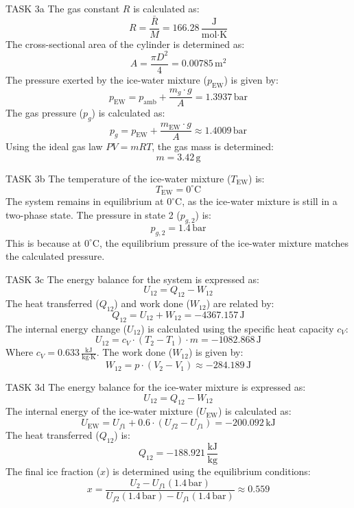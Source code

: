 TASK 3a  
The gas constant \( R \) is calculated as:  
\[
R = \frac{\bar{R}}{M} = 166.28 \, \frac{\text{J}}{\text{mol·K}}
\]  
The cross-sectional area of the cylinder is determined as:  
\[
A = \frac{\pi D^2}{4} = 0.00785 \, \text{m}^2
\]  
The pressure exerted by the ice-water mixture (\( p_{\text{EW}} \)) is given by:  
\[
p_{\text{EW}} = p_{\text{amb}} + \frac{m_g \cdot g}{A} = 1.3937 \, \text{bar}
\]  
The gas pressure (\( p_g \)) is calculated as:  
\[
p_g = p_{\text{EW}} + \frac{m_{\text{EW}} \cdot g}{A} \approx 1.4009 \, \text{bar}
\]  
Using the ideal gas law \( PV = mRT \), the gas mass is determined:  
\[
m = 3.42 \, \text{g}
\]  

TASK 3b  
The temperature of the ice-water mixture (\( T_{\text{EW}} \)) is:  
\[
T_{\text{EW}} = 0^\circ\text{C}
\]  
The system remains in equilibrium at \( 0^\circ\text{C} \), as the ice-water mixture is still in a two-phase state. The pressure in state 2 (\( p_{g,2} \)) is:  
\[
p_{g,2} = 1.4 \, \text{bar}
\]  
This is because at \( 0^\circ\text{C} \), the equilibrium pressure of the ice-water mixture matches the calculated pressure.  

TASK 3c  
The energy balance for the system is expressed as:  
\[
U_{12} = Q_{12} - W_{12}
\]  
The heat transferred (\( Q_{12} \)) and work done (\( W_{12} \)) are related by:  
\[
Q_{12} = U_{12} + W_{12} = -4367.157 \, \text{J}
\]  
The internal energy change (\( U_{12} \)) is calculated using the specific heat capacity \( c_V \):  
\[
U_{12} = c_V \cdot (T_2 - T_1) \cdot m = -1082.868 \, \text{J}
\]  
Where \( c_V = 0.633 \, \frac{\text{kJ}}{\text{kg·K}} \).  
The work done (\( W_{12} \)) is given by:  
\[
W_{12} = p \cdot (V_2 - V_1) \approx -284.189 \, \text{J}
\]  

TASK 3d  
The energy balance for the ice-water mixture is expressed as:  
\[
U_{12} = Q_{12} - W_{12}
\]  
The internal energy of the ice-water mixture (\( U_{\text{EW}} \)) is calculated as:  
\[
U_{\text{EW}} = U_{f1} + 0.6 \cdot (U_{f2} - U_{f1}) = -200.092 \, \text{kJ}
\]  
The heat transferred (\( Q_{12} \)) is:  
\[
Q_{12} = -188.921 \, \frac{\text{kJ}}{\text{kg}}
\]  
The final ice fraction (\( x \)) is determined using the equilibrium conditions:  
\[
x = \frac{U_2 - U_{f1} (1.4 \, \text{bar})}{U_{f2} (1.4 \, \text{bar}) - U_{f1} (1.4 \, \text{bar})} \approx 0.559
\]  